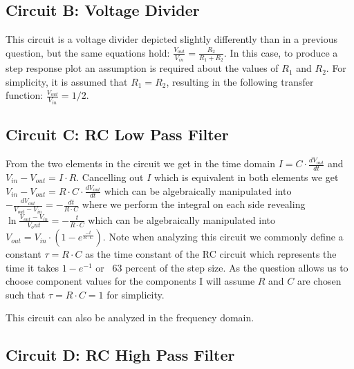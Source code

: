 \documentclass[main.tex]{subfiles}
\begin{document}

\subsection{Circuit B: Voltage Divider}
This circuit is a voltage divider depicted slightly differently than in a previous question, but the same equations hold: $\frac{V_{out}}{V_{in}} = \frac{R_2}{R_1 + R_2}$. In this case, to produce a step response plot an assumption is required about the values of $R_1$ and $R_2$. For simplicity, it is assumed that $R_1 = R_2$, resulting in the following transfer function: $\frac{V_{out}}{V_{in}} = 1/2$.


\subsection{Circuit C: RC Low Pass Filter}
From the two elements in the circuit we get in the time domain $I = C \cdot \frac{dV_{out}}{dt}$ and $V_{in} - V_{out} = I \cdot R$. Cancelling out $I$ which is equivalent in both elements we get $V_{in} - V_{out} = R \cdot C \cdot \frac{dV_{out}}{dt}$ which can be algebraically manipulated into $-\frac{dV_{out}}{V_{out}-V_{in}} = -\frac{dt}{R \cdot C}$ where we perform the integral on each side revealing $\ln{\frac{V_{out}-V_{in}}{V_out}}=-\frac{t}{R \cdot C}$ which can be algebraically manipulated into $V_{out}=V_{in} \cdot (1-e^{\frac{-t}{R \cdot C}})$. Note when analyzing this circuit we commonly define a constant $\tau = R \cdot C$ as the time constant of the RC circuit which represents the time it takes $1-e^{-1}$ or ~63 percent of the step size. As the question allows us to choose component values for the components I will assume $R$ and $C$ are chosen such that $\tau = R \cdot C = 1$ for simplicity.


This circuit can also be analyzed in the frequency domain. 



\subsection{Circuit D: RC High Pass Filter}
\end{document}
